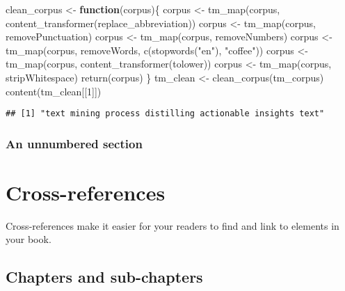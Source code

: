 \documentclass[
]{article}
\newenvironment{Shaded}{\begin{snugshade}}{\end{snugshade}}
\newcommand{\ControlFlowTok}[1]{\textcolor[rgb]{0.13,0.29,0.53}{\textbf{#1}}}
\newcommand{\DecValTok}[1]{\textcolor[rgb]{0.00,0.00,0.81}{#1}}
\newcommand{\FunctionTok}[1]{\textcolor[rgb]{0.00,0.00,0.00}{#1}}
\newcommand{\NormalTok}[1]{#1}
\newcommand{\OtherTok}[1]{\textcolor[rgb]{0.56,0.35,0.01}{#1}}
\newcommand{\StringTok}[1]{\textcolor[rgb]{0.31,0.60,0.02}{#1}}
\begin{document}
\begin{Shaded}
\begin{Highlighting}[]
\NormalTok{clean\_corpus }\OtherTok{\textless{}{-}} \ControlFlowTok{function}\NormalTok{(corpus)\{}
\NormalTok{  corpus }\OtherTok{\textless{}{-}} \FunctionTok{tm\_map}\NormalTok{(corpus, }\FunctionTok{content\_transformer}\NormalTok{(replace\_abbreviation))}
\NormalTok{  corpus }\OtherTok{\textless{}{-}} \FunctionTok{tm\_map}\NormalTok{(corpus, removePunctuation)}
\NormalTok{  corpus }\OtherTok{\textless{}{-}} \FunctionTok{tm\_map}\NormalTok{(corpus, removeNumbers)}
\NormalTok{  corpus }\OtherTok{\textless{}{-}} \FunctionTok{tm\_map}\NormalTok{(corpus, removeWords, }\FunctionTok{c}\NormalTok{(}\FunctionTok{stopwords}\NormalTok{(}\StringTok{"en"}\NormalTok{), }\StringTok{"coffee"}\NormalTok{))}
\NormalTok{  corpus }\OtherTok{\textless{}{-}} \FunctionTok{tm\_map}\NormalTok{(corpus, }\FunctionTok{content\_transformer}\NormalTok{(tolower))}
\NormalTok{  corpus }\OtherTok{\textless{}{-}} \FunctionTok{tm\_map}\NormalTok{(corpus, stripWhitespace)}
  \FunctionTok{return}\NormalTok{(corpus)}
\NormalTok{\}}
\NormalTok{tm\_clean }\OtherTok{\textless{}{-}} \FunctionTok{clean\_corpus}\NormalTok{(tm\_corpus)}
\FunctionTok{content}\NormalTok{(tm\_clean[[}\DecValTok{1}\NormalTok{]])}
\end{Highlighting}
\end{Shaded}

\begin{verbatim}
## [1] "text mining process distilling actionable insights text"
\end{verbatim}

\hypertarget{an-unnumbered-section}{%
\subsubsection*{An unnumbered section}\label{an-unnumbered-section}}

\hypertarget{cross}{%
\section{Cross-references}\label{cross}}

Cross-references make it easier for your readers to find and link to elements in your book.

\hypertarget{chapters-and-sub-chapters}{%
\subsection{Chapters and sub-chapters}\label{chapters-and-sub-chapters}}
\end{document}
